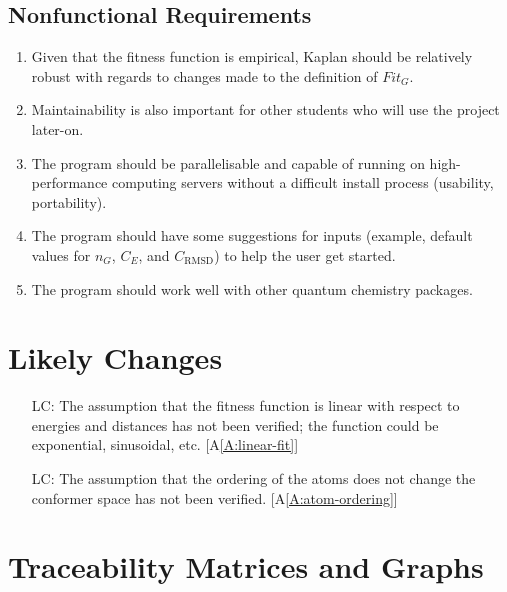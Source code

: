 \documentclass[12pt]{article}
\newcommand{\aref}[1]{A\ref{#1}}
\newcounter{lcnum} %
\newcommand{\progname}{Kaplan} %
\begin{document}
\subsection{Nonfunctional Requirements}

\begin{enumerate}
	\item Given that the fitness function is 
	empirical, \progname{} should be relatively 
robust with regards to changes made to the definition 
of $Fit_G$.

\item Maintainability is also important for other 
students who will use the project 
later-on. 

\item The program should be parallelisable and capable 
of running on 
high-performance computing servers without a difficult install process 
(usability, portability). 

\item The program should have some suggestions for 
inputs (example, default values for $n_G$, $C_E$, and 
$C_\text{RMSD}$) to help the user get started. 

\item The program should work well with other quantum 
chemistry packages.

\end{enumerate}

\section{Likely Changes}    

\noindent \begin{itemize}

\item[LC\refstepcounter{lcnum}\thelcnum\label{LC_linear-fit}:] The assumption 
that the fitness function is linear with respect to energies and distances has 
not been verified; the function could be exponential, sinusoidal, etc.
[\aref{A:linear-fit}]

\item[LC\refstepcounter{lcnum}\thelcnum\label{LC_indep-ordering}:] The 
assumption that the ordering of the atoms does not change the conformer space 
has not been verified. [\aref{A:atom-ordering}]

\end{itemize}

\section{Traceability Matrices and Graphs}
\end{document}
